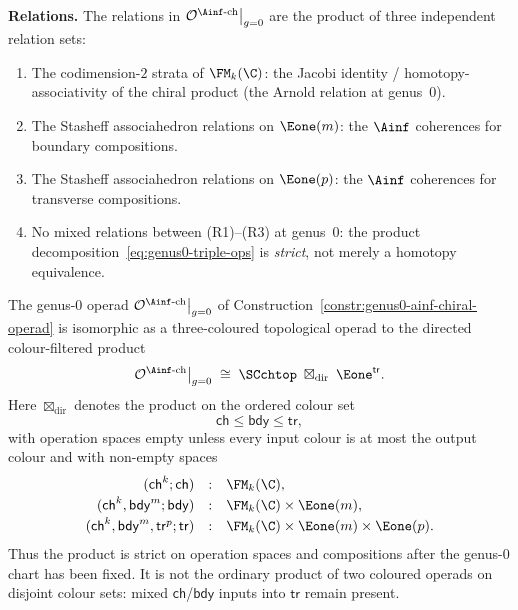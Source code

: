 \begin{construction}
\medskip\noindent
\textbf{Relations.}
The relations in $\mathcal{O}^{\Ainf\text{-ch}}\big|_{g=0}$
are the product of three independent relation sets:
\begin{enumerate}[label=\textup{(R\arabic*)}]
\item The codimension-$2$ strata of $\FM_k(\C)$: the Jacobi
 identity / homotopy-associativity of the chiral product
 (the Arnold relation at genus~$0$).
\item The Stasheff associahedron relations on $\Eone(m)$:
 the $\Ainf$ coherences for boundary compositions.
\item The Stasheff associahedron relations on $\Eone(p)$:
 the $\Ainf$ coherences for transverse compositions.
\item No mixed relations between (R1)--(R3) at genus~$0$:
 the product decomposition~\eqref{eq:genus0-triple-ops}
 is \emph{strict}, not merely a homotopy equivalence.
\end{enumerate}
\end{construction}

\begin{proposition}
\label{prop:genus0-product-decomposition}
The genus-$0$ operad
$\mathcal{O}^{\Ainf\text{-ch}}\big|_{g=0}$ of
Construction~\textup{\ref{constr:genus0-ainf-chiral-operad}} is
isomorphic as a three-coloured topological operad to the directed
colour-filtered product
\begin{equation}\label{eq:genus0-product}
 \mathcal{O}^{\Ainf\text{-ch}}\big|_{g=0}
 \;\cong\;
 \SCchtop \;\boxtimes_{\mathrm{dir}}\; \Eone^{\mathsf{tr}} .
\end{equation}
Here $\boxtimes_{\mathrm{dir}}$ denotes the product on the ordered
colour set
\[
 \mathsf{ch}\leq\mathsf{bdy}\leq\mathsf{tr},
\]
with operation spaces empty unless every input colour is at most the
output colour and with non-empty spaces
\[
\begin{array}{rcl}
(\mathsf{ch}^k;\mathsf{ch}) &:& \FM_k(\C),\\[2pt]
(\mathsf{ch}^k,\mathsf{bdy}^m;\mathsf{bdy})
&:& \FM_k(\C)\times\Eone(m),\\[2pt]
(\mathsf{ch}^k,\mathsf{bdy}^m,\mathsf{tr}^p;\mathsf{tr})
&:& \FM_k(\C)\times\Eone(m)\times\Eone(p).
\end{array}
\]
Thus the product is strict on operation spaces and compositions after
the genus-$0$ chart has been fixed. It is not the ordinary product of
two coloured operads on disjoint colour sets: mixed
$\mathsf{ch}$/$\mathsf{bdy}$ inputs into $\mathsf{tr}$ remain present.
\end{proposition}

